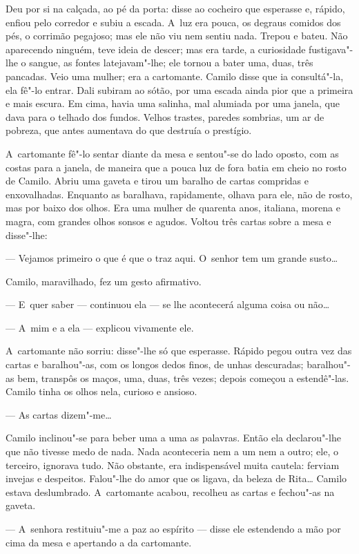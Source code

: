 \begin{linenumbers}
Deu por si na calçada, ao pé da porta: disse ao cocheiro que esperasse
e, rápido, enfiou pelo corredor e subiu a escada. A~luz era pouca, os
degraus comidos dos pés, o corrimão pegajoso; mas ele não viu nem sentiu
nada. Trepou e bateu. Não aparecendo ninguém, teve ideia de descer; mas
era tarde, a curiosidade fustigava"-lhe o sangue, as fontes
latejavam"-lhe; ele tornou a bater uma, duas, três pancadas. Veio uma
mulher; era a cartomante. Camilo disse que ia consultá"-la, ela fê"-lo
entrar. Dali subiram ao sótão, por uma escada ainda pior que a primeira
e mais escura. Em cima, havia uma salinha, mal alumiada por uma janela,
que dava para o telhado dos fundos. Velhos trastes, paredes sombrias, um
ar de pobreza, que antes aumentava do que destruía o prestígio.

A~cartomante fê"-lo sentar diante da mesa e sentou"-se do lado oposto, com
as costas para a janela, de maneira que a pouca luz de fora batia em
cheio no rosto de Camilo. Abriu uma gaveta e tirou um baralho de cartas
compridas e enxovalhadas. Enquanto as baralhava, rapidamente, olhava
para ele, não de rosto, mas por baixo dos olhos. Era uma mulher de
quarenta anos, italiana, morena e magra, com grandes olhos sonsos e
agudos. Voltou três cartas sobre a mesa e disse"-lhe:

--- Vejamos primeiro o que é que o traz aqui. O~senhor tem um grande
susto\ldots{}

Camilo, maravilhado, fez um gesto afirmativo.

--- E~quer saber --- continuou ela --- se lhe acontecerá alguma coisa ou
não\ldots{}

--- A~mim e a ela --- explicou vivamente ele.

A~cartomante não sorriu: disse"-lhe só que esperasse. Rápido pegou outra
vez das cartas e baralhou"-as, com os longos dedos finos, de unhas
descuradas; baralhou"-as bem, transpôs os maços, uma, duas, três vezes;
depois começou a estendê"-las. Camilo tinha os olhos nela, curioso e
ansioso.

--- As cartas dizem"-me\ldots{}

Camilo inclinou"-se para beber uma a uma as palavras. Então ela
declarou"-lhe que não tivesse medo de nada. Nada aconteceria nem a um nem
a outro; ele, o terceiro, ignorava tudo. Não obstante, era indispensável
muita cautela: ferviam invejas e despeitos. Falou"-lhe do amor que os
ligava, da beleza de Rita\ldots{} Camilo estava deslumbrado. A~cartomante
acabou, recolheu as cartas e fechou"-as na gaveta.

--- A~senhora restituiu"-me a paz ao espírito --- disse ele estendendo a
mão por cima da mesa e apertando a da cartomante.


\end{linenumbers}
